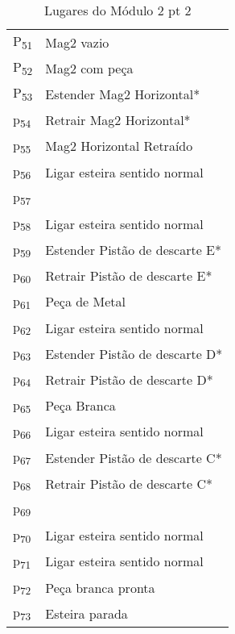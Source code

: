 \begin{table}[htbp]
\caption{Lugares do Módulo 2 pt 2}
\centering
\begin{tabular}{ll}
P\textsubscript{51} & Mag2 vazio\\
P\textsubscript{52} & Mag2 com peça\\
P\textsubscript{53} & Estender Mag2 Horizontal*\\
p\textsubscript{54} & Retrair Mag2 Horizontal*\\
p\textsubscript{55} & Mag2 Horizontal Retraído\\
p\textsubscript{56} & Ligar esteira sentido normal\\
p\textsubscript{57} & \\
p\textsubscript{58} & Ligar esteira sentido normal\\
p\textsubscript{59} & Estender Pistão de descarte E*\\
p\textsubscript{60} & Retrair Pistão de descarte E*\\
p\textsubscript{61} & Peça de Metal\\
p\textsubscript{62} & Ligar esteira sentido normal\\
p\textsubscript{63} & Estender Pistão de descarte D*\\
p\textsubscript{64} & Retrair Pistão de descarte D*\\
p\textsubscript{65} & Peça Branca\\
p\textsubscript{66} & Ligar esteira sentido normal\\
p\textsubscript{67} & Estender Pistão de descarte C*\\
p\textsubscript{68} & Retrair Pistão de descarte C*\\
p\textsubscript{69} & \\
p\textsubscript{70} & Ligar esteira sentido normal\\
p\textsubscript{71} & Ligar esteira sentido normal\\
p\textsubscript{72} & Peça branca pronta\\
p\textsubscript{73} & Esteira parada\\
\end{tabular}
\end{table}

